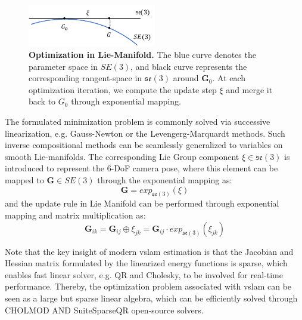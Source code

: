 \begin{figure}[t]
    \centering
	\includegraphics[width=0.5\textwidth]{figures/prelim/liegroup.pdf}
	\caption[Optimization in Lie-Manifold]{\textbf{Optimization in Lie-Manifold.} The blue curve denotes the parameter space in $SE(3)$, and black curve represents the corresponding rangent-space in $\mathfrak{se}(3)$ around $\mathbf{G}_0$. At each optimization iteration, we compute the update step $\xi$ and merge it back to $G_0$ through exponential mapping.
	\label{fig:preliminaries_liegroup}}
\end{figure} 

The formulated minimization problem is commonly solved via successive linearization, e.g. Gauss-Newton or the Levengerg-Marquardt methods. 
Such inverse compositional methods can be seamlessly generalized to variables on smooth Lie-manifolds. 
The corresponding Lie Group component $\xi \in \mathfrak{se}(3)$ is introduced to represent the 6-DoF camera pose, where this element can be mapped to $\mathbf{G} \in SE(3)$ through the exponential mapping as:
\begin{equation} \label{eq:preliminaries_expmapping}
\mathbf{G} = exp_{\mathfrak{se}(3)}(\xi)
\end{equation}
and the update rule in Lie Manifold can be performed through exponential mapping and matrix multiplication as:
\begin{equation} \label{eq:preliminaries_expaddition}
\mathbf{G}_{ik} = \mathbf{G}_{ij} \oplus \xi_{jk}  = \mathbf{G}_{ij} \cdot exp_{\mathfrak{se}(3)}(\xi_{jk})
\end{equation}

Note that the key insight of modern \acrshort{vslam} estimation is that the Jacobian and Hessian matrix formulated by the linearized energy functions is sparse, which enables fast linear solver, e.g. QR and Cholesky, to be involved for real-time performance.
Thereby, the optimization problem associated with \acrshort{vslam} can be seen as a large but sparse linear algebra, which can be efficiently solved through CHOLMOD AND SuiteSparseQR open-source solvers. 



